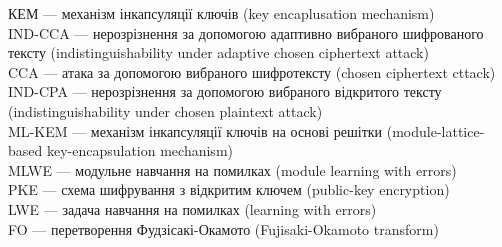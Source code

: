 \noindent КЕМ --- механізм інкапсуляції ключів (key encaplusation mechanism)\\
IND-CCA ---  нерозрізнення  за допомогою адаптивно вибраного шифрованого тексту (indistinguishability under adaptive chosen ciphertext attack)\\
CCA --- атака за допомогою вибраного шифротексту (chosen ciphertext cttack)\\
IND-CPA --- нерозрізнення за допомогою вибраного відкритого тексту (indistinguishability under chosen plaintext attack) \\
ML-KEM --- механізм інкапсуляції ключів на основі решітки (module-lattice-based key-encapsulation mechanism)\\
MLWE --- модульне навчання на помилках (module learning with errors)\\
PKE --- схема шифрування з відкритим ключем (public-key encryption)\\
LWE --- задача навчання на помилках (learning with errors)\\
FO --- перетворення Фудзісакі-Окамото (Fujisaki-Okamoto transform) \\